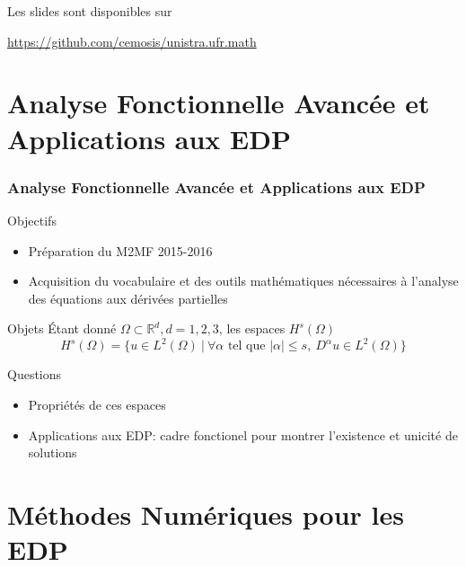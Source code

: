 \documentclass{beamer}
\begin{document}
\begin{frame}
  Les slides sont disponibles sur
  \begin{center}
    \centerline{\url{https://github.com/cemosis/unistra.ufr.math}}
  \end{center}
\end{frame}

\section{Analyse Fonctionnelle Avancée et Applications aux EDP}

\begin{frame}\frametitle{Analyse Fonctionnelle Avancée et Applications
    aux EDP}
  \begin{block}{Objectifs}
    \begin{itemize}
    \item Préparation du M2MF 2015-2016
    \item Acquisition du vocabulaire et des outils mathématiques nécessaires à
      l'analyse des équations aux dérivées partielles
    \end{itemize}
  \end{block}
  \begin{block}{Objets}
    Étant donné $\Omega \subset \mathbb{R}^d, d=1,2,3$, les espaces $H^s(\Omega)$
    \begin{equation*}
      H^s(\Omega)=\{ u \in L^2(\Omega)~|~\forall\alpha\text{ tel que }|\alpha|\le s,~D^\alpha u\in L^2(\Omega)\}
    \end{equation*}
  \end{block}
  \begin{block}{Questions}
    \begin{itemize}
    \item Propriétés de ces espaces
    \item Applications aux EDP: cadre fonctionel pour montrer
      l'existence et unicité de solutions
    \end{itemize}
  \end{block}
\end{frame}

\section{Méthodes Numériques pour les EDP}
\end{document}
